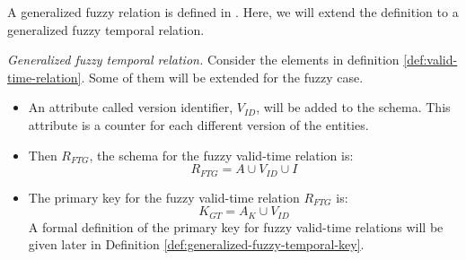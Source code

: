 A generalized fuzzy relation is defined in \cite{Medina1994}. Here, we will extend the definition to a generalized fuzzy temporal relation.

\begin{definition}
\emph{Generalized fuzzy temporal relation.}
\label{def:fuzzy-temporal-relation}
Consider the elements in definition \ref{def:valid-time-relation}. Some of them will be extended for the fuzzy case.

\begin{itemize}
\item An attribute called version identifier, $V_{ID}$, will be added to the schema. This attribute is a counter for each different version of the entities. 



\item Then $R_{FTG}$, the schema for the fuzzy valid-time relation is:
\begin{equation}
 \label{eq:fuzzy-valid-time-relation}
R_{FTG} = A \cup V_{ID} \cup  I
\end{equation}
\item The primary key for the fuzzy valid-time relation $R_{FTG}$ is:
\begin{equation}
 \label{eq:fuzzy-valid-time-temporal-pk}
K_{GT} = A_K \cup V_{ID}
\end{equation}
A formal definition of the primary key for fuzzy valid-time relations will be given later in Definition \ref{def:generalized-fuzzy-temporal-key}.



\end{itemize}
\end{definition}

